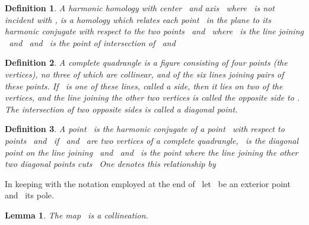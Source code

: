 \documentclass[a4paper,twoside,12pt]{article}
\newtheorem{lemma}{Lemma}[section]
\newtheorem{definition}{Definition}[section]
\begin{document}
\begin{definition} A harmonic homology with center \coordHE{}\ and axis \coordHE{}\
where \coordHE{}\ is not incident with \coordHE{}, is a homology which relates each point \myHighlight{$%
A$}\coordHE{}\ in the plane to its harmonic conjugate with respect to the two points \myHighlight{$B$}\coordHE{}%
\ and \myHighlight{$(b,[A,B]),$}\coordHE{}\ where \myHighlight{$[A,B]$}\coordHE{}\ is the line joining \coordHE{}\ and \coordHE{}\ and \myHighlight{$%
(b,[A,B])$}\coordHE{}\ is the point of intersection of \myHighlight{$b$}\coordHE{}\ and \myHighlight{$[A,B].$}\coordHE{}
\end{definition}

\begin{definition} A complete quadrangle is a figure consisting of
four points (the vertices), no three of which are collinear, and of the six
lines joining pairs of these points. If \myHighlight{$l$}\coordHE{}\ is one of these lines, called a
side, then it lies on two of the vertices, and the line joining the other
two vertices is called the opposite side to \myHighlight{$l$}\coordHE{}. The intersection of two
opposite sides is called a diagonal point.
\end{definition}

\begin{definition} A point \coordHE{}\ is the harmonic conjugate of a point \myHighlight{$%
C $}\coordHE{}\ with respect to points \coordHE{}\ and \coordHE{}\ if \coordHE{}\ and \myHighlight{$B$}\coordHE{}\ are two vertices
of a complete quadrangle, \myHighlight{$C$}\coordHE{}\ is the diagonal point on the line joining \myHighlight{$A$}\coordHE{}%
\ and \myHighlight{$B,$}\coordHE{}\ and \myHighlight{$D$}\coordHE{}\ is the point where the line joining the other two
diagonal points cuts \myHighlight{$[A,B].$}\coordHE{}\ One denotes this relationship by \myHighlight{$H(AB,CD).$}\coordHE{}
\end{definition}

     In keeping with the notation employed at the end of \coordHE{}\ 
let \coordHE{}\ be an exterior point and \coordHE{}\ its pole.

\begin{lemma} The map \coordHE{}\ is a collineation.
\end{lemma}
\end{document}
